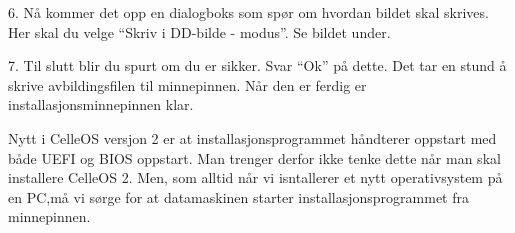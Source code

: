 \item{6.} N\aa{} kommer det opp en dialogboks som sp\o r om hvordan bildet skal skrives. Her skal du velge ``Skriv i DD-bilde - modus''. Se bildet under.
\vskip 1.5pc
\vskip 1.5pc
\item{7.} Til slutt blir du spurt om du er sikker. Svar ``Ok'' p\aa{} dette. Det tar en stund \aa{} skrive avbildingsfilen til minnepinnen. N\aa r den er ferdig er installasjons\-minnepinnen klar.







Nytt i CelleOS versjon 2 er at installasjonsprogrammet håndterer oppstart med både UEFI og BIOS oppstart. Man trenger derfor ikke tenke dette når man skal installere CelleOS 2. Men, som alltid når vi isntallerer et nytt operativsystem på en PC,må vi sørge for at datamaskinen starter installasjonsprogrammet fra minnepinnen.

